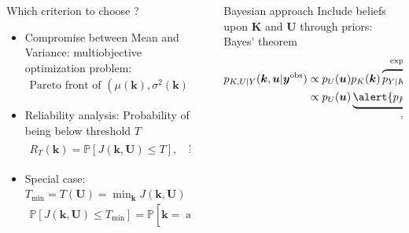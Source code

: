 \documentclass{beamer}
\newlength{\sepwid}
\newlength{\thirdcolwid}
\newcommand{\Prob}{\mathbb{P}}
\DeclareMathOperator*{\argmin}{arg\,min}
\DeclareMathOperator*{\argmax}{arg\,max}
\newcommand{\yobs}{\bm{y}^{\mathrm{obs}}}
\newcommand{\kest}{\hat{\bm{k}}}
\begin{document}
\begin{frame}[t]
\begin{columns}[t]
\begin{column}{\thirdcolwid}
\begin{block}{Which criterion to choose ? \cite{lehman_designing_2004,janusevskis_simultaneous_2010}}
\begin{itemize}
  \item \alert{Compromise} between Mean and Variance: multiobjective optimization problem:
  \begin{align*}
    \text{Pareto front of } (\mu(\bm{k}),\sigma^2(\bm{k}))
  \end{align*}
\item Reliability analysis: \alert{Probability of being below threshold} $T$
  \begin{align*}
    R_T(\bm{k}) =  \Prob\left[J(\bm{k},\bm{U}) \leq T\right], \quad \kest_{R_T} = \argmax R_T(\bm{k})
  \end{align*}
\item Special case: $T_{\min} = T(\bm{U}) = \min_{\bm{k}} J(\bm{k},\bm{U})$
  \begin{align*}
    \Prob\left[J(\bm{k},\bm{U}) \leq T_{\min}\right] = \Prob\left[\bm{k} = \argmin_{\tilde{\bm{k}}} J(\tilde{\bm{k}},\bm{U}) \right]
  \end{align*}
\end{itemize}
\end{block}
\end{column}

\begin{column}{\sepwid}\end{column} %

\begin{column}{\thirdcolwid} %


%
  \begin{block}{Bayesian approach}
    Include beliefs upon $\bm{K}$ and $\bm{U}$ through priors:
Bayes' theorem
  \begin{align*}
    p_{K,U|Y}(\bm{k},\bm{u}|\yobs) &\propto p_U(\bm{u}) p_K(\bm{k}) \overbrace{p_{Y|K,U}(y|\bm{k},\bm{u})}^{\exp(-J(\bm{k},\bm{u}))} \\
                                   &\propto p_U(\bm{u})  \underbrace{\alert{p_{K|Y,U}(\bm{k}|\yobs,\bm{u})}}_{ = f(\bm{k},\bm{u}) }
  \end{align*}

  
  

\end{block}
\end{column}
\end{columns}
\end{frame}
\end{document}
